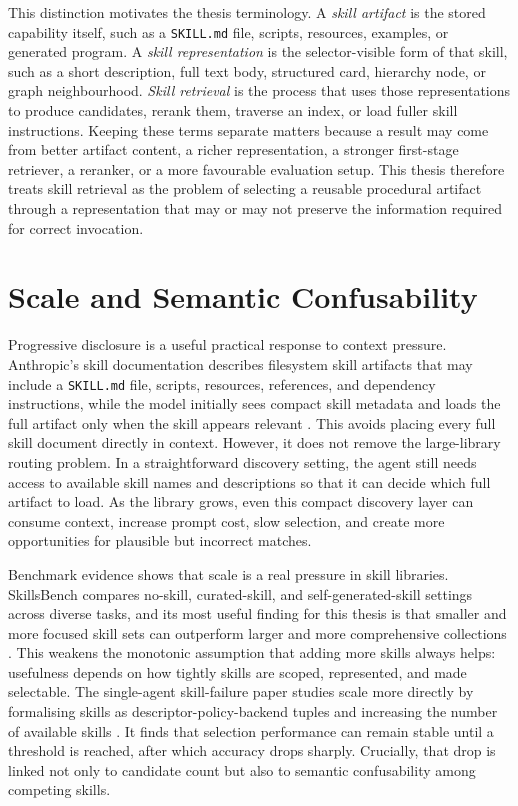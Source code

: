 This distinction motivates the thesis terminology. A \emph{skill artifact} is the stored capability itself, such as a \texttt{SKILL.md} file, scripts, resources, examples, or generated program. A \emph{skill representation} is the selector-visible form of that skill, such as a short description, full text body, structured card, hierarchy node, or graph neighbourhood. \emph{Skill retrieval} is the process that uses those representations to produce candidates, rerank them, traverse an index, or load fuller skill instructions. Keeping these terms separate matters because a result may come from better artifact content, a richer representation, a stronger first-stage retriever, a reranker, or a more favourable evaluation setup. This thesis therefore treats skill retrieval as the problem of selecting a reusable procedural artifact through a representation that may or may not preserve the information required for correct invocation.

\section{Scale and Semantic Confusability}

Progressive disclosure is a useful practical response to context pressure. Anthropic's skill documentation describes filesystem skill artifacts that may include a \texttt{SKILL.md} file, scripts, resources, references, and dependency instructions, while the model initially sees compact skill metadata and loads the full artifact only when the skill appears relevant \cite{anthropic2025skills}. This avoids placing every full skill document directly in context. However, it does not remove the large-library routing problem. In a straightforward discovery setting, the agent still needs access to available skill names and descriptions so that it can decide which full artifact to load. As the library grows, even this compact discovery layer can consume context, increase prompt cost, slow selection, and create more opportunities for plausible but incorrect matches.

Benchmark evidence shows that scale is a real pressure in skill libraries. SkillsBench compares no-skill, curated-skill, and self-generated-skill settings across diverse tasks, and its most useful finding for this thesis is that smaller and more focused skill sets can outperform larger and more comprehensive collections \cite{li2026skillsbench}. This weakens the monotonic assumption that adding more skills always helps: usefulness depends on how tightly skills are scoped, represented, and made selectable. The single-agent skill-failure paper studies scale more directly by formalising skills as descriptor-policy-backend tuples and increasing the number of available skills \cite{li2026singleagent}. It finds that selection performance can remain stable until a threshold is reached, after which accuracy drops sharply. Crucially, that drop is linked not only to candidate count but also to semantic confusability among competing skills.

